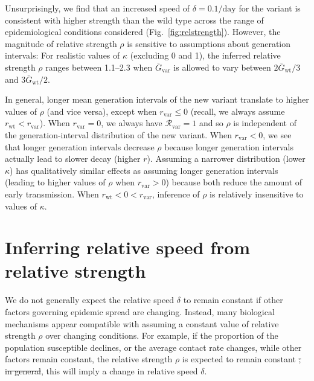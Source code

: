 \documentclass[12pt]{article}
\newcommand{\fref}[1]{Fig.~\ref{fig:#1}}
\newcommand{\vvvar}{\mathrm{var}}
\newcommand{\wwwt}{\mathrm{wt}}
\newcommand{\rx}[1]{\ensuremath{{r}_{#1}}\xspace}
\newcommand{\rw}{\rx{\wwwt}}
\newcommand{\rv}{\rx{\vvvar}}
\newcommand{\Rx}[1]{\ensuremath{{\mathcal R}_{#1}}\xspace}
\newcommand{\Rv}{\Rx{\vvvar}}
\newcommand{\pday}{\ensuremath{/\textrm{day}}}
\newcommand{\Gx}[1]{\ensuremath{{\bar G}_{#1}}\xspace}
\newcommand{\Gw}{\Gx{\wwwt}}
\newcommand{\Gv}{\Gx{\vvvar}}
\providecommand{\DIFaddtex}[1]{{\protect\color{blue}\uwave{#1}}} %
\providecommand{\DIFdeltex}[1]{{\protect\color{red}\sout{#1}}}                      %
\providecommand{\DIFaddbegin}{} %
\providecommand{\DIFaddend}{} %
\providecommand{\DIFdelbegin}{} %
\providecommand{\DIFdelend}{} %
\providecommand{\DIFadd}[1]{\texorpdfstring{\DIFaddtex{#1}}{#1}} %
\providecommand{\DIFdel}[1]{\texorpdfstring{\DIFdeltex{#1}}{}} %
\newcommand{\DIFscaledelfig}{0.5}
\newlength{\DIFdelgraphicswidth} %
\newlength{\DIFdelgraphicsheight} %
\newcommand{\DIFaddincludegraphics}[2][]{{\color{blue}\fbox{\DIFOincludegraphics[#1]{#2}}}} %
\newcommand{\DIFdelincludegraphics}[2][]{%
\sbox{\DIFdelgraphicsbox}{\DIFOincludegraphics[#1]{#2}}%
\settoboxwidth{\DIFdelgraphicswidth}{\DIFdelgraphicsbox} %
\settoboxtotalheight{\DIFdelgraphicsheight}{\DIFdelgraphicsbox} %
\scalebox{\DIFscaledelfig}{%
\parbox[b]{\DIFdelgraphicswidth}{\usebox{\DIFdelgraphicsbox}\\[-\baselineskip] \rule{\DIFdelgraphicswidth}{0em}}\llap{\resizebox{\DIFdelgraphicswidth}{\DIFdelgraphicsheight}{%
\setlength{\unitlength}{\DIFdelgraphicswidth}%
\begin{picture}(1,1)%
\thicklines\linethickness{2pt} %
{\color[rgb]{1,0,0}\put(0,0){\framebox(1,1){}}}%
{\color[rgb]{1,0,0}\put(0,0){\line( 1,1){1}}}%
{\color[rgb]{1,0,0}\put(0,1){\line(1,-1){1}}}%
\end{picture}%
}\hspace*{3pt}}} %
} %
\DeclareRobustCommand{\DIFaddbegin}{\DIFOaddbegin \let\includegraphics\DIFaddincludegraphics} %
\DeclareRobustCommand{\DIFaddend}{\DIFOaddend \let\includegraphics\DIFOincludegraphics} %
\DeclareRobustCommand{\DIFdelbegin}{\DIFOdelbegin \let\includegraphics\DIFdelincludegraphics} %
\DeclareRobustCommand{\DIFdelend}{\DIFOaddend \let\includegraphics\DIFOincludegraphics} %
\begin{document}
Unsurprisingly, we find that an increased speed of $\delta=0.1\pday$ for the variant is consistent with higher strength than the wild type across the range of epidemiological conditions considered (\fref{relstrength}).
However, the magnitude of relative strength $\rho$ is sensitive to assumptions about generation intervals:
For realistic values of $\kappa$ (excluding 0 and 1), the inferred relative strength $\rho$ ranges between 1.1--2.3 when $\Gv$ is allowed to vary between $2\Gw/3$ and $3\Gw/2$.

In general, longer mean generation intervals of the new variant translate to higher values of $\rho$ (and vice versa), except when $\rv \leq 0$ (recall, we always assume $\rw<\rv$).
When $\rv = 0$, we always have $\Rv = 1$ and so $\rho$ is independent of the generation-interval distribution of the new variant.
When $\rv < 0$, we see that longer generation intervals decrease $\rho$ because longer generation intervals actually lead to slower decay (higher $r$).
Assuming a narrower distribution (lower $\kappa$) has qualitatively similar effects as assuming longer generation intervals (leading to higher values of $\rho$ when $\rv > 0$) because both reduce the amount of early transmission.
When $\rw < 0 < \rv$, inference of $\rho$ is relatively insensitive to values of $\kappa$.

\DIFdelbegin %

\DIFdelend \section{Inferring relative speed from relative strength}

We do not generally expect the relative speed $\delta$ to remain constant if other factors governing epidemic spread are changing.
Instead, many biological mechanisms appear compatible with assuming a constant value of relative strength $\rho$ over changing conditions.
For example, if the proportion of the population susceptible declines, or the average contact rate changes, while other factors remain constant, the relative strength $\rho$ is expected to remain constant \DIFdelbegin \DIFdel{; 
in general}\DIFdelend \DIFaddbegin \DIFadd{\mbox{%
\citep{leung2017monitoring,leung2020empirical,di2021impact,leung2021early}}\hspace{0pt}%
; 
as we show in this section}\DIFaddend , this will imply a change in relative speed $\delta$.
\end{document}

